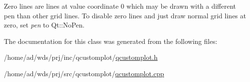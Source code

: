 Zero lines are lines at value coordinate 0 which may be drawn with a different pen than other grid lines. To disable zero lines and just draw normal grid lines at zero, set {\itshape pen} to Qt\+::\+No\+Pen. 

The documentation for this class was generated from the following files\+:\begin{DoxyCompactItemize}
\item 
/home/ad/wds/prj/inc/qcustomplot/\hyperlink{qcustomplot_8h}{qcustomplot.\+h}\item 
/home/ad/wds/prj/src/qcustomplot/\hyperlink{qcustomplot_8cpp}{qcustomplot.\+cpp}\end{DoxyCompactItemize}
